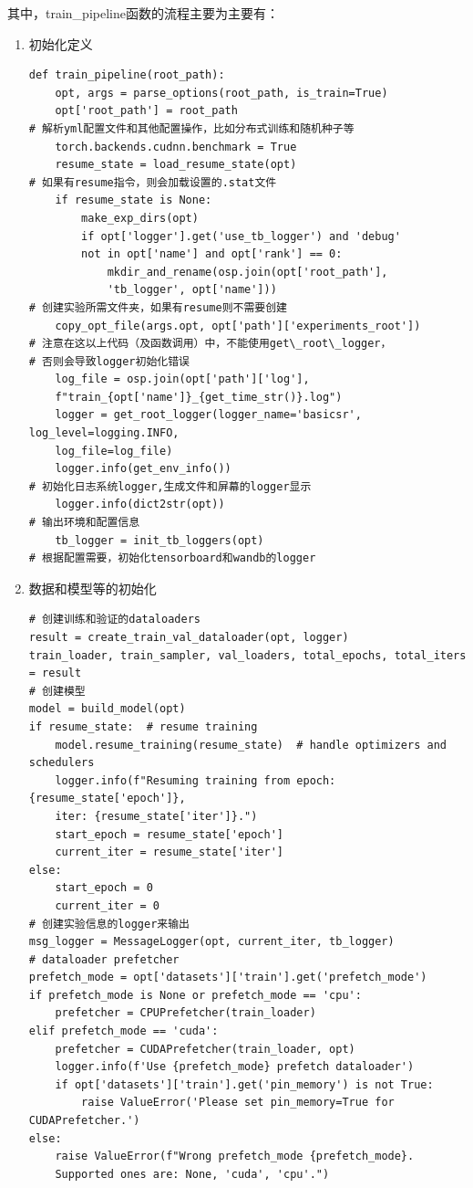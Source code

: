 \documentclass[../main.tex]{subfiles}
\begin{document}
\begin{enumerate}
其中，train\_pipeline函数的流程主要为主要有：
\begin{enumerate}

\item 初始化定义

\begin{verbatim}
def train_pipeline(root_path):
    opt, args = parse_options(root_path, is_train=True)
    opt['root_path'] = root_path
# 解析yml配置文件和其他配置操作，比如分布式训练和随机种子等
    torch.backends.cudnn.benchmark = True
    resume_state = load_resume_state(opt)
# 如果有resume指令，则会加载设置的.stat文件
    if resume_state is None:
        make_exp_dirs(opt)
        if opt['logger'].get('use_tb_logger') and 'debug'
        not in opt['name'] and opt['rank'] == 0:
            mkdir_and_rename(osp.join(opt['root_path'],
            'tb_logger', opt['name']))
# 创建实验所需文件夹，如果有resume则不需要创建
    copy_opt_file(args.opt, opt['path']['experiments_root'])
# 注意在这以上代码（及函数调用）中，不能使用get\_root\_logger，
# 否则会导致logger初始化错误
    log_file = osp.join(opt['path']['log'],
    f"train_{opt['name']}_{get_time_str()}.log")
    logger = get_root_logger(logger_name='basicsr', log_level=logging.INFO,
    log_file=log_file)
    logger.info(get_env_info())
# 初始化日志系统logger,生成文件和屏幕的logger显示
    logger.info(dict2str(opt))
# 输出环境和配置信息
    tb_logger = init_tb_loggers(opt)
# 根据配置需要，初始化tensorboard和wandb的logger

\end{verbatim}

\item 数据和模型等的初始化

\begin{verbatim}
# 创建训练和验证的dataloaders
result = create_train_val_dataloader(opt, logger)
train_loader, train_sampler, val_loaders, total_epochs, total_iters = result
# 创建模型
model = build_model(opt)
if resume_state:  # resume training
    model.resume_training(resume_state)  # handle optimizers and schedulers
    logger.info(f"Resuming training from epoch: {resume_state['epoch']},
    iter: {resume_state['iter']}.")
    start_epoch = resume_state['epoch']
    current_iter = resume_state['iter']
else:
    start_epoch = 0
    current_iter = 0
# 创建实验信息的logger来输出
msg_logger = MessageLogger(opt, current_iter, tb_logger)
# dataloader prefetcher
prefetch_mode = opt['datasets']['train'].get('prefetch_mode')
if prefetch_mode is None or prefetch_mode == 'cpu':
    prefetcher = CPUPrefetcher(train_loader)
elif prefetch_mode == 'cuda':
    prefetcher = CUDAPrefetcher(train_loader, opt)
    logger.info(f'Use {prefetch_mode} prefetch dataloader')
    if opt['datasets']['train'].get('pin_memory') is not True:
        raise ValueError('Please set pin_memory=True for CUDAPrefetcher.')
else:
    raise ValueError(f"Wrong prefetch_mode {prefetch_mode}.
    Supported ones are: None, 'cuda', 'cpu'.")


\end{verbatim}
\end{enumerate}
\end{enumerate}
\end{document}
